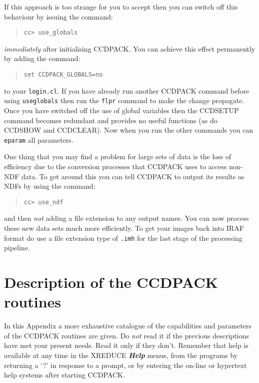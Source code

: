 \documentclass[twoside,11pt]{article}
\newcommand{\htmlref}[2]{#1}
\newcommand{\latexhtml}[2]{#1}
\renewcommand{\_}{\texttt{\symbol{95}}}
\newcommand{\ttsize}{\latexhtml{\small}{}}
\newcommand{\menu}[1]{{\ttsize \bf \em #1}}
\newcommand{\text}[1]{{\ttsize \tt #1}}
\newcommand{\routine}[1]{{\sc #1}}
\newcommand{\xroutine}[1]{\htmlref{{\sc #1}}{#1}}
\begin{document}
If this approach is too strange for you to accept then you can switch
off this behaviour by issuing the command:
\begin{quote}
\begin{verbatim}
cc> use_globals
\end{verbatim}
\end{quote}
{\em{immediately}} after initialising CCDPACK. You can achieve this effect
permanently by adding the command:
\begin{quote}
\begin{verbatim}
set CCDPACK_GLOBALS=no
\end{verbatim}
\end{quote}
to your \text{login.cl}. If you have already run another CCDPACK
command before using \text{use\_globals} then run the \text{flpr}
command to make the change propagate. Once you have switched off the
use of global variables then the \routine{CCDSETUP} command becomes
redundant and provides no useful functions (as do \routine{CCDSHOW}
and \routine{CCDCLEAR}). Now when you run the other
commands you can \text{eparam} all parameters.

One thing that you may find a problem for large sets of data is the
loss of efficiency due to the conversion processes that CCDPACK uses
to access non-NDF data. To get around this you can tell CCDPACK to
output its results as NDFs by using the command:
\begin{quote}
\begin{verbatim}
cc> use_ndf
\end{verbatim}
\end{quote}
and then {\em{not}} adding a file extension to any output names. You can
now process these new data sets much more efficiently. To get your
images back into IRAF format do use a file extension type of
\text{.imh} for the last stage of the processing pipeline.

\section{Description of the CCDPACK routines \label{app:description}}

In this Appendix a more exhaustive catalogue of the capabilities and parameters
of the CCDPACK routines are given. Do {\em{not}} read it if the previous
descriptions have met your present needs. Read it only if they don't. Remember
that help is available at any time in the \xroutine{XREDUCE}
\menu{Help} menus, from the programs by returning a `?' in response to a prompt,
or by entering the on-line or hypertext help systems after starting CCDPACK.
\end{document}
